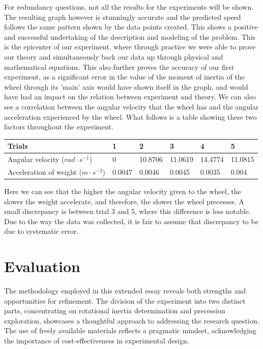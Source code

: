 \documentclass{article}
\begin{document}
For redundancy questions, not all the results for the experiments will be shown. The resulting graph however is stunningly accurate and the predicted speed follows the same pattern shown by the data points created. This shows a positive and successful undertaking of the description and modeling of the problem. This is the epicenter of our experiment, where through practice we were able to prove our theory and simultaneously back our data up through physical and mathematical equations. This also further proves the accuracy of our first experiment, as a significant error in the value of the moment of inertia of the wheel through its 'main' axis would have shown itself in the graph, and would have had an impact on the relation between experiment and theory. 
We can also see a correlation between the angular velocity that the wheel has and the angular acceleration experienced by the wheel. What follows is a table showing these two factors throughout the experiment.

\begin{table}[!ht]
    \centering
    \begin{tabular}{|l|l|l|l|l|l|}
    \hline
        Trials & 1 & 2 & 3 & 4 & 5 \\ \hline
        Angular velocity ($rad\cdot s^{-1}$) & 0 & 10.8706 & 11.0619 & 14.4774 & 11.0815 \\ \hline
        Acceleration of weight ($m\cdot s^{-2}$)& 0.0047 & 0.0046 & 0.0045 & 0.0035 & 0.004 \\ \hline
    \end{tabular}
\end{table}

Here we can see that the higher the angular velocity given to the wheel, the slower the weight accelerate, and therefore, the slower the wheel precesses. A small discrepancy is between trial 3 and 5, where this difference is less notable. Due to the way the data was collected, it is fair to assume that discrepancy to be due to systematic error.

\pagebreak
\section{Evaluation}
The methodology employed in this extended essay reveals both strengths and opportunities for refinement. The division of the experiment into two distinct parts, concentrating on rotational inertia determination and precession exploration, showcases a thoughtful approach to addressing the research question. The use of freely available materials reflects a pragmatic mindset, acknowledging the importance of cost-effectiveness in experimental design.
\end{document}
